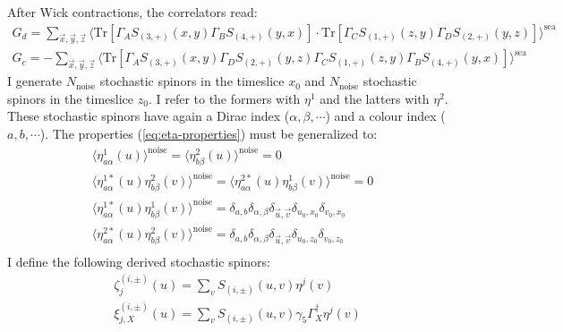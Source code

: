 \documentclass[english, LaM, oneside, noexaminfo]{sapthesis}
\begin{document}
\newline
After Wick contractions, the correlators read:
\begin{equation}\label{eq:contractions-stochastic-method}
    \begin{gathered}
        G_d = \sum_{\vec x, \vec y, \vec z} \bigg\langle \text{Tr}\left[\Gamma_A S_{(3,+)}(x,y)\Gamma_B S_{(4,+)}(y,x)\right]\cdot\text{Tr}\left[\Gamma_C S_{(1,+)}(z,y)\Gamma_D S_{(2,+)}(y,z)\right] \bigg\rangle^{\text{sea}} \\
        G_c = - \sum_{\vec x, \vec y, \vec z} \bigg\langle \text{Tr}\left[\Gamma_A S_{(3,+)}(x,y)\Gamma_D S_{(2,+)}(y,z)\Gamma_C S_{(1,+)}(z,y)\Gamma_B S_{(4,+)}(y,x)\right] \bigg\rangle^{\text{sea}}
    \end{gathered}
\end{equation}
\newline
I generate $N_{\text{noise}}$ stochastic spinors in the timeslice $x_0$ and $N_{\text{noise}}$ stochastic spinors in the timeslice $z_0$.
I refer to the formers with $\eta^{1}$ and the latters with $\eta^{2}$.
These stochastic spinors have again a Dirac index ($\alpha,\beta,\cdots$) and a colour index ($a,b,\cdots$).
The properties (\ref{eq:eta-properties}) must be generalized to:
\begin{equation}
    \begin{gathered}
        \langle \eta^{1}_{a\alpha} (u) \rangle^{\text{noise}} = \langle \eta^{2}_{b\beta} (u) \rangle^{\text{noise}} = 0 \\
        \langle \eta^{1*}_{a\alpha} (u) \eta^{2}_{b\beta} (v) \rangle^{\text{noise}} = \langle \eta^{2*}_{a\alpha} (u) \eta^{1}_{b\beta} (v) \rangle^{\text{noise}} = 0 \\
        \langle \eta^{1*}_{a\alpha} (u) \eta^{1}_{b\beta} (v) \rangle^{\text{noise}} = \delta_{a,b} \delta_{\alpha,\beta} \delta_{\vec u, \vec v} \delta_{u_0,x_0} \delta_{v_0,x_0} \\
        \langle \eta^{2*}_{a\alpha} (u) \eta^{2}_{b\beta} (v) \rangle^{\text{noise}} = \delta_{a,b} \delta_{\alpha,\beta} \delta_{\vec u, \vec v} \delta_{u_0,z_0} \delta_{v_0,z_0} \\
    \end{gathered}
\end{equation}
I define the following derived stochastic spinors:
\begin{equation}
    \begin{aligned}
        & \zeta^{(i,\pm)}_{j} (u) = \sum_{v} S_{(i,\pm)}(u,v)\eta^{j}(v) \\
        & \xi^{(i,\pm)}_{j,X} (u) = \sum_{v} S_{(i,\pm)}(u,v) \gamma_5 \Gamma_X^\dag \eta^{j}(v)
    \end{aligned}
\end{equation}
\end{document}
